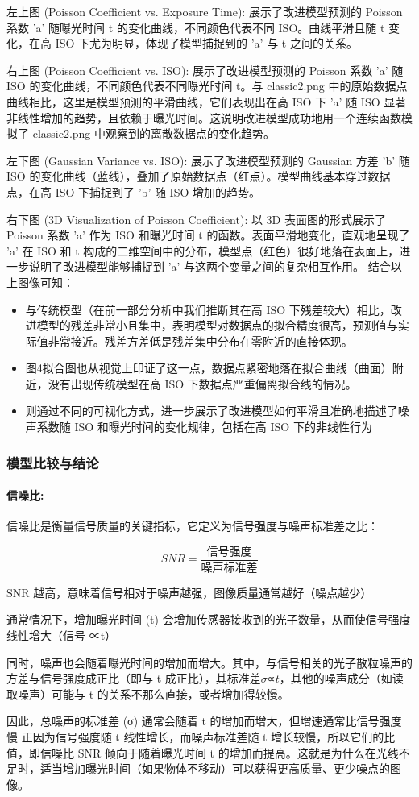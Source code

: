 \documentclass[a4paper]{article}
\begin{document}
左上图 (Poisson Coefficient vs. Exposure Time): 展示了改进模型预测的 Poisson 系数 'a' 随曝光时间 t 的变化曲线，不同颜色代表不同 ISO。曲线平滑且随 t 变化，在高 ISO 下尤为明显，体现了模型捕捉到的 'a' 与 t 之间的关系。
\par
右上图 (Poisson Coefficient vs. ISO): 展示了改进模型预测的 Poisson 系数 'a' 随 ISO 的变化曲线，不同颜色代表不同曝光时间 t。与 classic2.png 中的原始数据点曲线相比，这里是模型预测的平滑曲线，它们表现出在高 ISO 下 'a' 随 ISO 显著非线性增加的趋势，且依赖于曝光时间。这说明改进模型成功地用一个连续函数模拟了 classic2.png 中观察到的离散数据点的变化趋势。
\par
左下图 (Gaussian Variance vs. ISO): 展示了改进模型预测的 Gaussian 方差 'b' 随 ISO 的变化曲线（蓝线），叠加了原始数据点（红点）。模型曲线基本穿过数据点，在高 ISO 下捕捉到了 'b' 随 ISO 增加的趋势。
\par
右下图 (3D Visualization of Poisson Coefficient): 以 3D 表面图的形式展示了 Poisson 系数 'a' 作为 ISO 和曝光时间 t 的函数。表面平滑地变化，直观地呈现了 'a' 在 ISO 和 t 构成的二维空间中的分布，模型点（红色）很好地落在表面上，进一步说明了改进模型能够捕捉到 'a' 与这两个变量之间的复杂相互作用。
结合以上图像可知：
	\begin{itemize}
		\item 与传统模型（在前一部分分析中我们推断其在高 ISO 下残差较大）相比，改进模型的残差非常小且集中，表明模型对数据点的拟合精度很高，预测值与实际值非常接近。残差方差低是残差集中分布在零附近的直接体现。
		\item 图4拟合图也从视觉上印证了这一点，数据点紧密地落在拟合曲线（曲面）附近，没有出现传统模型在高 ISO 下数据点严重偏离拟合线的情况。
		\item 则通过不同的可视化方式，进一步展示了改进模型如何平滑且准确地描述了噪声系数随 ISO 和曝光时间的变化规律，包括在高 ISO 下的非线性行为
	\end{itemize}
	\subsubsection{模型比较与结论}
	\paragraph{信噪比:}
	信噪比是衡量信号质量的关键指标，它定义为信号强度与噪声标准差之比：\par
	$$SNR=\dfrac{\text{信号强度}}{\text{噪声标准差}}$$
	\par
    \hspace{2em}SNR 越高，意味着信号相对于噪声越强，图像质量通常越好（噪点越少）\par
	通常情况下，增加曝光时间 (t) 会增加传感器接收到的光子数量，从而使信号强度线性增大（信号 ∝t）\par
	同时，噪声也会随着曝光时间的增加而增大。其中，与信号相关的光子散粒噪声的方差与信号强度成正比（即与 t 成正比），其标准差$\sigma $∝$t$，其他的噪声成分（如读取噪声）可能与 t 的关系不那么直接，或者增加得较慢。
	\par
	因此，总噪声的标准差 (σ) 通常会随着 t 的增加而增大，但增速通常比信号强度慢
    正因为信号强度随 t 线性增长，而噪声标准差随 t 增长较慢，所以它们的比值，即信噪比 SNR 倾向于随着曝光时间 t 的增加而提高。这就是为什么在光线不足时，适当增加曝光时间（如果物体不移动）可以获得更高质量、更少噪点的图像。
\end{document}
